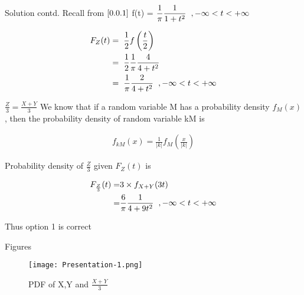 \documentclass{beamer}
\providecommand{\brak}[1]{\ensuremath{\left(#1\right)}}
\providecommand{\abs}[1]{\vert#1\vert}
\begin{document}
\begin{frame}{Solution contd.}
  Recall from $\eqref{0.0.1}$ f(t) = $\displaystyle\frac{1}{\pi} \frac{1}{1+{t}^2} \hspace{0.2cm},-\infty < t < +\infty$
  \begin{block}{}
    \begin{align}
      F_Z(t) = & \hspace{0.2cm} \frac{1}{2} f\brak{\frac{t}{2}}                                                 \\
      =        & \hspace{0.2cm} \frac{1}{2} \displaystyle\frac{1}{\pi}  \frac{4}{4+{t}^2}                       \\
      =        & \hspace{0.2cm} \displaystyle\frac{1}{\pi}  \frac{2}{4+{t}^2} \hspace{0.2cm}, -\infty<t<+\infty
    \end{align}
  \end{block}
\end{frame}

\begin{frame}{$\frac{Z}{3} = \frac{X+Y}{3}$}
  We know that if a random variable M has a probability density $f_M(x)$, then the probability density of random variable kM is
  \begin{block}{}
    \begin{align}
      f_{kM}\brak{x} = \frac{1}{\abs{k}} f_M\brak{\frac{x}{\abs{k}}}
    \end{align}
  \end{block}
  Probability density of $\frac{Z}{3}$ given $F_Z(t)$ is
  \begin{block}{}
    \begin{align}
      F_{\frac{Z}{3}}(t) = & 3\times \displaystyle f_{X+Y}(3t)                                 \\
      =                    & \frac{6}{\pi} \frac{1}{4+9{t}^2}\hspace{0.2cm}, -\infty<t<+\infty
    \end{align}
    \begin{center}
      Thus option 1 is correct
    \end{center}
  \end{block}
\end{frame}
\begin{frame}{Figures}
  \begin{figure}[!]
    \centering
     \texttt{[image: Presentation-1.png]}
    \caption{PDF of X,Y and $\displaystyle\frac{X+Y}{3}$}
  \end{figure}
\end{frame}
\end{document}
